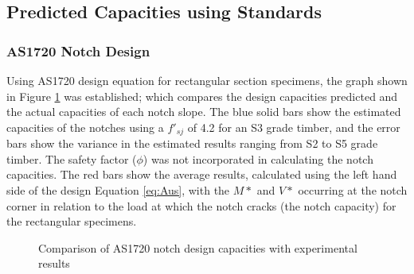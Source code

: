 \documentclass[11pt,a4paper]{article}
\numberwithin{equation}{subsection}
\begin{document}
\subsection{Predicted Capacities using Standards}

\subsubsection{AS1720 Notch Design}
Using AS1720 design equation for rectangular section specimens, the graph shown in Figure \ref{fig:AS_notch} was established; which compares the design capacities predicted and the actual capacities of each notch slope. The blue solid bars show the estimated capacities of the notches using a $f'_{sj}$ of 4.2 for an S3 grade timber, and the error bars show the variance in the estimated results ranging from S2 to S5 grade timber. The safety factor ($\phi$) was not incorporated in calculating the notch capacities. The red bars show the average results, calculated using the left hand side of the design Equation \ref{eq:Aus}, with the $M*$ and $V*$ occurring at the notch corner in relation to the load at which the notch cracks (the notch capacity) for the rectangular specimens.

\begin{figure}[h]
	\begin{center}
	\end{center}
	\caption{Comparison of AS1720 notch design capacities with experimental results}
	\label{fig:AS_notch}
\end{figure}
\end{document}
